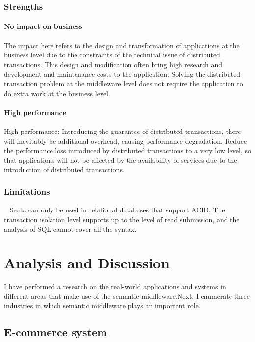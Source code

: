 \documentclass[conference]{IEEEtran}
\begin{document}
\subsubsection{Strengths}
\paragraph{No impact on business}
The impact here refers to the design and transformation of applications at the business level due to the constraints of the technical issue of distributed transactions. This design and modification often bring high research and development and maintenance costs to the application. Solving the distributed transaction problem at the middleware level does not require the application to do extra work at the business level.

\paragraph{High performance}
High performance: Introducing the guarantee of distributed transactions, there will inevitably be additional overhead, causing performance degradation. Reduce the performance loss introduced by distributed transactions to a very low level, so that applications will not be affected by the availability of services due to the introduction of distributed transactions.

\subsubsection{Limitations}
\
\newline
\indent
Seata can only be used in relational databases that support ACID.
The transaction isolation level supports up to the level of read submission, and the analysis of SQL cannot cover all the syntax.

\section{Analysis and Discussion}

I have performed a research on the real-world applications and systems in different areas that make use of the semantic middleware.Next, I enumerate three industries in which semantic middleware plays an important role.

\subsection{E-commerce system}
\end{document}
